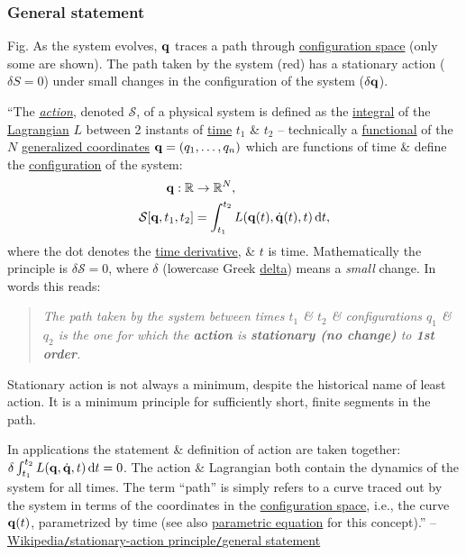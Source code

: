 \documentclass{article}
\begin{document}
\subsubsection{General statement}
\textsf{Fig. As the system evolves, ${\bf q}$ traces a path through \href{https://en.wikipedia.org/wiki/Configuration_space_(physics)}{configuration space} (only some are shown). The path taken by the system (red) has a stationary action ($\delta S = 0$) under small changes in the configuration of the system ($\delta{\bf q}$).}

``The \href{https://en.wikipedia.org/wiki/Action_(physics)}{\textit{action}}, denoted $\mathcal{S}$, of a physical system is defined as the \href{https://en.wikipedia.org/wiki/Integral_(mathematics)}{integral} of the \href{https://en.wikipedia.org/wiki/Lagrangian_mechanics}{Lagrangian} $L$ between 2 instants of \href{https://en.wikipedia.org/wiki/Time_in_physics}{time} $t_1$ \& $t_2$ -- technically a \href{https://en.wikipedia.org/wiki/Functional_(mathematics)}{functional} of the $N$ \href{https://en.wikipedia.org/wiki/Generalized_coordinates}{generalized coordinates} ${\bf q} = (q_1,\ldots,q_n)$ which are functions of time \& define the \href{https://en.wikipedia.org/wiki/Configuration_space_(physics)}{configuration} of the system:
\begin{align*}
	{\bf q}:\mathbb{R}&\to\mathbb{R}^N,\\
	\mathcal{S}[{\bf q},t_1,t_2] &= \int_{t_1}^{t_2} L({\bf q}(t),\dot{\bf q}(t),t)\,{\rm d}t,
\end{align*}
where the dot denotes the \href{https://en.wikipedia.org/wiki/Time_derivative}{time derivative}, \& $t$ is time. Mathematically the principle is $\delta\mathcal{S} = 0$, where $\delta$ (lowercase Greek \href{https://en.wikipedia.org/wiki/Delta_(letter)}{delta}) means a \textit{small} change. In words this reads:
\begin{quotation}
	\textit{The path taken by the system between times $t_1$ \& $t_2$ \& configurations $q_1$ \& $q_2$ is the one for which the \textbf{action} is \textbf{stationary (no change)} to \textbf{1st order}.}
\end{quotation}
Stationary action is not always a minimum, despite the historical name of least action. It is a minimum principle for sufficiently short, finite segments in the path.

In applications the statement \& definition of action are taken together: $\delta\int_{t_1}^{t_2} L({\bf q},\dot{\bf q},t)\,{\rm d}t = 0$. The action \& Lagrangian both contain the dynamics of the system for all times. The term ``path'' is simply refers to a curve traced out by the system in terms of the coordinates in the \href{https://en.wikipedia.org/wiki/Configuration_space_(physics)}{configuration space}, i.e., the curve ${\bf q}(t)$, parametrized by time (see also \href{https://en.wikipedia.org/wiki/Parametric_equation}{parametric equation} for this concept).'' -- \href{https://en.wikipedia.org/wiki/Stationary-action_principle#General_statement}{Wikipedia{\tt/}stationary-action principle{\tt/}general statement}
\end{document}
